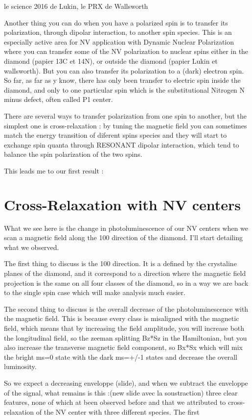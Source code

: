 \documentclass[a4paper]{article}
\begin{document}
le science 2016 de Lukin, le PRX de Wallsworth

Another thing you can do when you have a polarized spin is to transfer its polarization, through dipolar interaction,  to another spin species. This is an especially active area for NV application with Dynamic Nuclear Polarization where you can transfer some of the NV polarization to nuclear spins either in the diamond (papier 13C et 14N), or outside the diamond (papier Lukin et wallsworth).
But you can also transfer its polarization to a (dark) electron spin. So far, as far as y know, there has only been transfer to electric spin inside the diamond, and only to one particular spin which is the substitutional Nitrogen N minus defect, often called P1 center.

There are several ways to transfer polarization from one spin to another, but the simplest one is cross-relaxation : by tuning the magnetic field you can sometimes match the energy transition of diferent spins species and they will start to exchange spin quanta through RESONANT dipolar interaction, which tend to balance the spin polarization of the two spins.
 
This leads me to our first result :
\section{Cross-Relaxation with NV centers}
What we see here is the change in photoluminescence of our NV centers when we scan a magnetic field along the 100 direction of the diamond. I'll start detailing what we observed.

The first thing to discuss is the 100 direction. It is a defined by the crystaline planes of the diamond, and it correspond to a direction where the magnetic field projection is the same on all four classes of the diamond, so in a way we are back to the single spin case which will make analysis much easier.

The second thing to discuss is the overall decrease of the photoluminescence with the magnetic field. This is because every class is misaligned with the magnetic field, which means that by increasing the field amplitude, you will increase both the longitudinal field, so the zeeman splitting Bz*Sz in the Hamiltonian, but you also increase the transverse magnetic field component, so Bx*Sx which will mix the bright ms=0 state with the dark ms=+/-1 states and decrease the overall luminosity.

So we expect a decreasing enveloppe (slide), and when we subtract the enveloppe of the signal, what remains is this :(new slide avec la soustraction) three clear features, none of which at been observed before and that we attributed to cross-relaxation of the NV center with three different species. The first 

  
\end{document}
